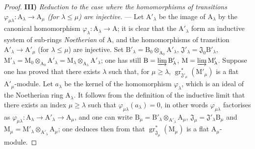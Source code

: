 \begin{proof}
\medskip
\noindent\textbf{III)} \emph{Reduction to the case where the homomorphisms of transitions $\varphi_{\mu\lambda}:\mathrm{A}_\lambda\to\mathrm{A}_\mu$ (for $\lambda\leqslant\mu$) are injective.} --- Let $\mathrm{A}'_\lambda$ be the image of $\mathrm{A}_\lambda$ by the canonical homomorphism $\varphi_\lambda:\mathrm{A}_\lambda\to\mathrm{A}$; it is clear that the $\mathrm{A}'_\lambda$ form an inductive system of sub-rings \emph{Noetherian} of $\mathrm{A}$, and the homomorphisms of transition $\mathrm{A}'_\lambda\to\mathrm{A}'_\mu$ (for $\lambda\leqslant\mu$) are injective. Set $\mathrm{B}'_\lambda=\mathrm{B}_0\otimes_{\mathrm{A}_0}\mathrm{A}'_\lambda$, $\mathfrak{J}'_\lambda=\mathfrak{J}_0\mathrm{B}'_\lambda$, $\mathrm{M}'_\lambda=\mathrm{M}_0\otimes_{\mathrm{A}_0}\mathrm{A}'_\lambda=\mathrm{M}_\lambda\otimes_{\mathrm{A}_\lambda}\mathrm{A}'_\lambda$; one has still $\mathrm{B}=\varinjlim\mathrm{B}'_\lambda$, $\mathrm{M}=\varinjlim\mathrm{M}'_\lambda$. Suppose one has proved that there exists $\lambda$ such that, for $\mu\geqslant\lambda$, $\operatorname{gr}^*_{\mathfrak{J}'_\mu}(\mathrm{M}'_\mu)$ is a flat $\mathrm{A}'_\mu$-module. Let $a_\lambda$ be the kernel of the homomorphism $\varphi_\lambda$, which is an ideal of the Noetherian ring $\mathrm{A}_\lambda$. It follows from the definition of the inductive limit that there exists an index $\mu\geqslant\lambda$ such that $\varphi_{\mu\lambda}(a_\lambda)=0$, in other words $\varphi_{\mu\lambda}$ factorises as $\varphi_{\mu\lambda}:\mathrm{A}_\lambda\to\mathrm{A}'_\lambda\to\mathrm{A}_\mu$, and one can write $\mathrm{B}_\mu=\mathrm{B}'_\lambda\otimes_{\mathrm{A}'_\lambda}\mathrm{A}_\mu$, $\mathfrak{J}_\mu=\mathfrak{J}'_\lambda\mathrm{B}_\mu$ and $\mathrm{M}_\mu=\mathrm{M}'_\lambda\otimes_{\mathrm{A}'_\lambda}\mathrm{A}_\mu$; one deduces then from  that $\operatorname{gr}^*_{\mathfrak{J}_\mu}(\mathrm{M}_\mu)$ is a flat $\mathrm{A}_\mu$-module.


\end{proof}
